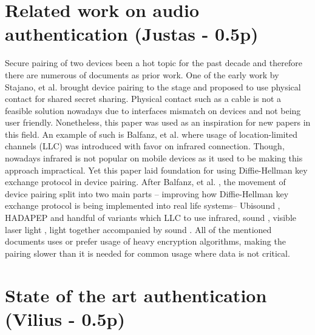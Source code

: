\documentclass[12pt]{article}
\begin{document}
\newpage

\section{Related work on audio authentication (Justas - 0.5p)}
\label{sec:Related work on audio authentication}
Secure pairing of two devices been a hot topic for the past decade and therefore there are numerous of documents as prior work. One of the early work by  Stajano, et al. \cite {pairingintro} brought device pairing to the stage and proposed to use physical contact for shared secret sharing. Physical contact such as a cable is not a feasible solution nowadays due to interfaces mismatch on devices and not being user friendly. Nonetheless, this paper was used as an inspiration for new papers in this field. An example of such is Balfanz, et al. \cite {talkingto} where usage of location-limited channels (LLC) was introduced with favor on infrared connection. Though, nowadays infrared is not popular on mobile devices as it used to be making this approach impractical. Yet this paper laid foundation for using Diffie-Hellman key exchange protocol in device pairing. After Balfanz, et al. \cite {talkingto} , the movement of device pairing split into two main parts – improving how Diffie-Hellman key exchange protocol is being implemented into real life systems– Ubisound \cite {ubisound}, HADAPEP \cite {hadapep} and handful of variants which LLC to use infrared, sound \cite {talkingto}, visible laser light \cite {laserlight}, light together accompanied by sound \cite {beeplight}.
\newline
All of the mentioned documents uses or prefer usage of heavy encryption algorithms, making the pairing slower than it is needed for common usage where data is not critical.

\section{State of the art authentication (Vilius - 0.5p)}
\label{sec:State of the art authentication}
\end{document}
